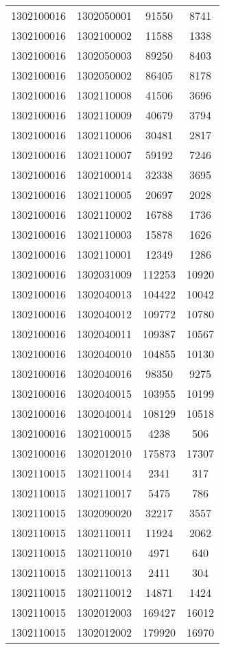 \begin{longtable}[h]{llcc}
		1302100016 & 1302050001 & 91550 & 8741\\
		1302100016 & 1302100002 & 11588 & 1338\\
		1302100016 & 1302050003 & 89250 & 8403\\
		1302100016 & 1302050002 & 86405 & 8178\\
		1302100016 & 1302110008 & 41506 & 3696\\
		1302100016 & 1302110009 & 40679 & 3794\\
		1302100016 & 1302110006 & 30481 & 2817\\
		1302100016 & 1302110007 & 59192 & 7246\\
		1302100016 & 1302100014 & 32338 & 3695\\
		1302100016 & 1302110005 & 20697 & 2028\\
		1302100016 & 1302110002 & 16788 & 1736\\
		1302100016 & 1302110003 & 15878 & 1626\\
		1302100016 & 1302110001 & 12349 & 1286\\
		1302100016 & 1302031009 & 112253 & 10920\\
		1302100016 & 1302040013 & 104422 & 10042\\
		1302100016 & 1302040012 & 109772 & 10780\\
		1302100016 & 1302040011 & 109387 & 10567\\
		1302100016 & 1302040010 & 104855 & 10130\\
		1302100016 & 1302040016 & 98350 & 9275\\
		1302100016 & 1302040015 & 103955 & 10199\\
		1302100016 & 1302040014 & 108129 & 10518\\
		1302100016 & 1302100015 & 4238 & 506\\
		1302100016 & 1302012010 & 175873 & 17307\\
		1302110015 & 1302110014 & 2341 & 317\\
		1302110015 & 1302110017 & 5475 & 786\\
		1302110015 & 1302090020 & 32217 & 3557\\
		1302110015 & 1302110011 & 11924 & 2062\\
		1302110015 & 1302110010 & 4971 & 640\\
		1302110015 & 1302110013 & 2411 & 304\\
		1302110015 & 1302110012 & 14871 & 1424\\
		1302110015 & 1302012003 & 169427 & 16012\\
		1302110015 & 1302012002 & 179920 & 16970\\

\end{longtable}
